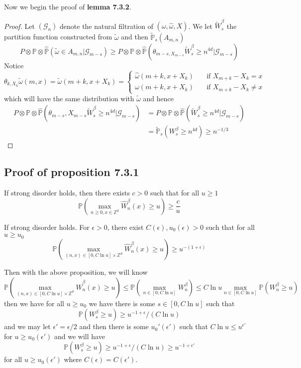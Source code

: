 Now we begin the proof of \textbf{lemma 7.3.2}.\par
\begin{proof}
    Let $(\mathcal{G}_n)$ denote the natural filtration of $(\omega,\hat{\omega},X)$. We let $\tilde{W}_s^{\beta}$ the partition function constructed from $\tilde{\omega}$ and then $\widetilde{\mathbb{P}}_s(A_{m,n})$
    \[
    P\otimes\mathbb{P}\otimes\widehat{\mathbb{P}}(\tilde{\omega}\in A_{m,n}|\mathcal{G}_{m-s}) \geq P\otimes\mathbb{P}\otimes\widehat{\mathbb{P}}(\theta_{m-s,X_{m-s}}\widetilde{W}_s^{\beta}\geq n^{4d}|\mathcal{G}_{m-s})
    \]
    Notice \[\theta_{k,X_k}\tilde{\omega}(m,x) = \tilde{\omega}(m+k,x+X_k) = \begin{cases}
        \hat{\omega}(m+k,x+X_k)\quad&\text{if }X_{m+k} - X_k= x\\
        \omega(m+k,x+X_k)&\text{if }X_{m+k} - X_k\neq x
    \end{cases}\]
    which will have the same distribution with $\tilde{\omega}$ and hence
    \[
    \begin{aligned}
        P\otimes\mathbb{P}\otimes\widehat{\mathbb{P}}(\theta_{m-s},X_{m-s}\widetilde{W}_s^{\beta}\geq n^{4d}|\mathcal{G}_{m-s}) &= P\otimes\mathbb{P}\otimes\widehat{\mathbb{P}}(\widetilde{W}_s^{\beta}\geq n^{4d}|\mathcal{G}_{m-s}) \\
        &=\widetilde{\mathbb{P}}_s(W_s^{\beta} \geq n^{4d}) \geq n^{-1/3}
    \end{aligned}
    \]
\end{proof}

\subsection{Proof of proposition 7.3.1}

\begin{theorem}
    If strong disorder holds, then there exists $c>0$ such that for all $u\geq 1$
    \[
    \mathbb{P}(\max_{n\geq 0, x\in\mathbb{Z}^d}\widehat{W}_n^{\beta}(x) \geq u) \geq \dfrac{c}{u}
    \]
\end{theorem}

\begin{proposition}
    If strong disorder holds. For $\epsilon > 0$, there exist $C(\epsilon), u_0(\epsilon) > 0$ such that for all $u\geq u_0$
    \[
    \mathbb{P}(\max_{(n,x)\in [0,C\ln u]\times\mathbb{Z}^d}\widehat{W}_n^{\beta}(x) \geq u) \geq u^{-(1+\epsilon)}
    \]
\end{proposition}

Then with the above proposition, we will know
\[
 \mathbb{P}(\max_{(n,x)\in [0,C\ln u]\times\mathbb{Z}^d}\widehat{W}_n^{\beta}(x) \geq u) \leq \mathbb{P}(\max_{n\in[0,C\ln u]} W_n^{\beta}) \leq C\ln u \max_{n\in [0,C\ln u]}\mathbb{P}(W_n^{\beta}\geq u)
\]
then we have for all $u\geq u_0$ we have there is some $s\in[0,C\ln u]$ such that
\[
\mathbb{P}(W_s^{\beta} \geq u) \geq u^{-1+\epsilon}/(C\ln u)
\]
and we may let $\epsilon' = \epsilon/2$ and then there is some $u_0'(\epsilon')$ such that $C\ln u \leq u^{\epsilon'}$ for $u\geq u_0(\epsilon')$ and we will have
\[
\mathbb{P}(W_s^{\beta} \geq u) \geq u^{-1+\epsilon}/(C\ln u) \geq u^{-1+\epsilon'}
\]
for all $u\geq u_0(\epsilon')$ where $C(\epsilon) = C(\epsilon')$.